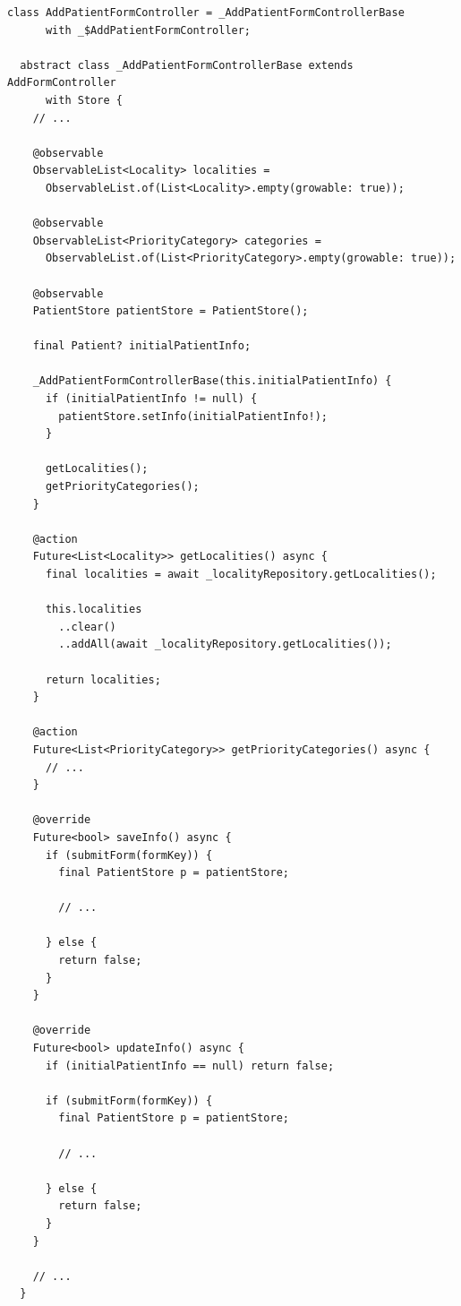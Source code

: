 \begin{lstlisting}[caption={Trechos da classe \textit{PatientFormController}}, label={lst:patient_form_controller}]
  class AddPatientFormController = _AddPatientFormControllerBase
      with _$AddPatientFormController;

  abstract class _AddPatientFormControllerBase extends AddFormController
      with Store {
    // ...

    @observable
    ObservableList<Locality> localities =
      ObservableList.of(List<Locality>.empty(growable: true));

    @observable
    ObservableList<PriorityCategory> categories =
      ObservableList.of(List<PriorityCategory>.empty(growable: true));
      
    @observable
    PatientStore patientStore = PatientStore();

    final Patient? initialPatientInfo;

    _AddPatientFormControllerBase(this.initialPatientInfo) {
      if (initialPatientInfo != null) {
        patientStore.setInfo(initialPatientInfo!);
      }
  
      getLocalities();
      getPriorityCategories();
    }

    @action
    Future<List<Locality>> getLocalities() async {
      final localities = await _localityRepository.getLocalities();

      this.localities
        ..clear()
        ..addAll(await _localityRepository.getLocalities());

      return localities;
    }

    @action
    Future<List<PriorityCategory>> getPriorityCategories() async {
      // ...
    }

    @override
    Future<bool> saveInfo() async {
      if (submitForm(formKey)) {
        final PatientStore p = patientStore;
        
        // ...

      } else {
        return false;
      }
    }

    @override
    Future<bool> updateInfo() async {
      if (initialPatientInfo == null) return false;

      if (submitForm(formKey)) {
        final PatientStore p = patientStore;
        
        // ...

      } else {
        return false;
      }
    }

    // ...
  }
\end{lstlisting}

